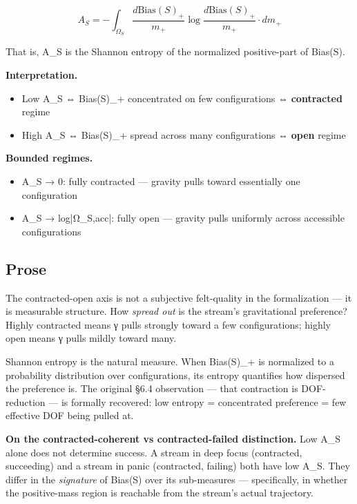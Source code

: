 \documentclass[11pt, openany]{book}
\begin{document}
$$A_S = -\int_{\Omega_S} \frac{d\text{Bias}(S)_+}{m_+} \log \frac{d\text{Bias}(S)_+}{m_+} \cdot dm_+$$

That is, A\_\allowbreak{}S is the Shannon entropy of the normalized positive-part of Bias(S).

\textbf{Interpretation.}
\begin{itemize}
\item Low A\_\allowbreak{}S ⇔ Bias(S)\_\allowbreak{}+ concentrated on few configurations ⇔ \textbf{contracted} regime
\item High A\_\allowbreak{}S ⇔ Bias(S)\_\allowbreak{}+ spread across many configurations ⇔ \textbf{open} regime
\end{itemize}

\textbf{Bounded regimes.}
\begin{itemize}
\item A\_\allowbreak{}S → 0: fully contracted --- gravity pulls toward essentially one configuration
\item A\_\allowbreak{}S → log|Ω\_\allowbreak{}S,acc|: fully open --- gravity pulls uniformly across accessible configurations
\end{itemize}

\subsection{Prose}

The contracted-open axis is not a subjective felt-quality in the formalization --- it is measurable structure. How \textit{spread out} is the stream's gravitational preference? Highly contracted means γ pulls strongly toward a few configurations; highly open means γ pulls mildly toward many.

Shannon entropy is the natural measure. When Bias(S)\_\allowbreak{}+ is normalized to a probability distribution over configurations, its entropy quantifies how dispersed the preference is. The original §6.4 observation --- that contraction is DOF-reduction --- is formally recovered: low entropy = concentrated preference = few effective DOF being pulled at.

\textbf{On the contracted-coherent vs contracted-failed distinction.} Low A\_\allowbreak{}S alone does not determine success. A stream in deep focus (contracted, succeeding) and a stream in panic (contracted, failing) both have low A\_\allowbreak{}S. They differ in the \textit{signature} of Bias(S) over its sub-measures --- specifically, in whether the positive-mass region is reachable from the stream's actual trajectory.
\end{document}
